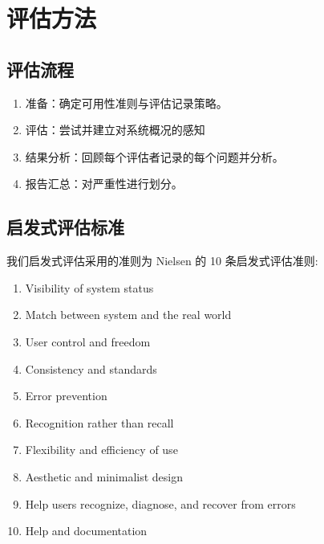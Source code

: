 \documentclass[a4paper,12pt]{article}
\begin{document}
\section{评估方法}
\subsection{评估流程}
\begin{enumerate}
    \item 准备：确定可用性准则与评估记录策略。
    \item 评估：尝试并建立对系统概况的感知
    \item 结果分析：回顾每个评估者记录的每个问题并分析。
    \item 报告汇总：对严重性进行划分。
\end{enumerate}

\subsection{启发式评估标准}
我们启发式评估采用的准则为 Nielsen 的 10 条启发式评估准则:
\begin{enumerate}
    \item Visibility of system status
    \item Match between system and the real world
    \item User control and freedom
    \item Consistency and standards
    \item Error prevention
    \item Recognition rather than recall
    \item Flexibility and efficiency of use
    \item Aesthetic and minimalist design
    \item Help users recognize, diagnose, and recover from errors
    \item Help and documentation
\end{enumerate}
\end{document}
